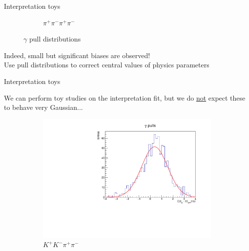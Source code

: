 \documentclass{beamer}
\begin{document}
\begin{frame}{Interpretation toys}
\begin{figure}
\begin{subfigure}{0.5\textwidth}
      \vspace{-0.3cm}
      \caption*{$\pi^+\pi^-\pi^+\pi^-$}
    \end{subfigure}
    \vspace{-0.5cm}
    \caption*{$\gamma$ pull distributions}
  \end{figure}
  \vspace{-0.3cm}
  \begin{center}
    Indeed, small but significant biases are observed!\\
    Use pull distributions to correct central values of physics parameters
  \end{center}
\end{frame}

\begin{frame}{Interpretation toys}
  \begin{center}
    We can perform toy studies on the interpretation fit, but we do \underline{not} expect these to behave very Gaussian...
  \end{center}
  \begin{figure}
    \centering
    \begin{subfigure}{0.5\textwidth}
      \centering
      \includegraphics[width=1.0\textwidth]{Plots/gamma_pull_toys_KKpipi.pdf}
      \vspace{-0.3cm}
      \caption*{$K^+K^-\pi^+\pi^-$}
    \end{subfigure}%
    \begin{subfigure}{0.5\textwidth}
      \centering

\end{subfigure}
\end{figure}
\end{frame}
\end{document}
